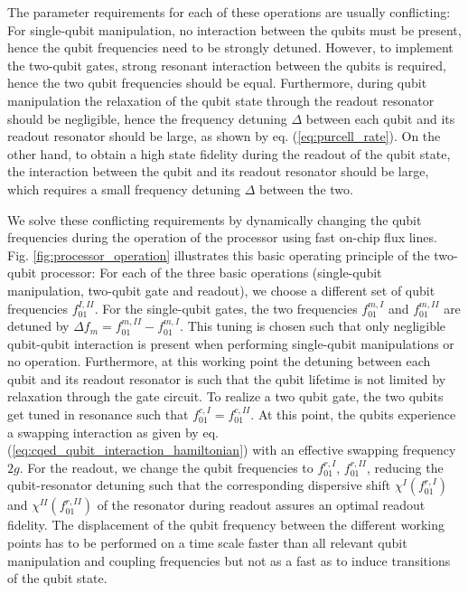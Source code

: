 The parameter requirements for each of these operations are usually conflicting: For single-qubit manipulation, no interaction between the qubits must be present, hence the qubit frequencies need to be strongly detuned. However, to implement the two-qubit gates, strong resonant interaction between the qubits is required, hence the two qubit frequencies should be equal. Furthermore, during qubit manipulation the relaxation of the qubit state through the readout resonator should be negligible, hence the frequency detuning $\Delta$ between each qubit and its readout resonator should be large, as shown by eq. (\ref{eq:purcell_rate}). On the other hand, to obtain a high state fidelity during the readout of the qubit state, the interaction between the qubit and its readout resonator should be large, which requires a small frequency detuning $\Delta$ between the two.

\smallskip

We solve these conflicting requirements by dynamically changing the qubit frequencies during the operation of the processor using fast on-chip flux lines. Fig. \ref{fig:processor_operation} illustrates this basic operating principle of the two-qubit processor: For each of the three basic operations (single-qubit manipulation, two-qubit gate and readout), we choose a different set of qubit frequencies $f_{01}^{I,II}$. For the single-qubit gates, the two frequencies $f_{01}^{m,I}$ and $f_{01}^{m,II}$ are detuned by $\Delta f_m = f_{01}^{m,II}-f_{01}^{m,I}$. This tuning is chosen such that only negligible qubit-qubit interaction is present when performing single-qubit manipulations or no operation. Furthermore, at this working point the detuning between each qubit and its readout resonator is such that the qubit lifetime is not limited by relaxation through the gate circuit. To realize a two qubit gate, the two qubits get tuned in resonance such that $f_{01}^{c,I} = f_{01}^{c,II}$. At this point, the qubits experience a swapping interaction as given by eq. (\ref{eq:cqed_qubit_interaction_hamiltonian}) with an effective swapping frequency $2g$. For the readout, we change the qubit frequencies to $f_{01}^{r,I}$, $f_{01}^{r,II}$, reducing the qubit-resonator detuning such that the corresponding dispersive shift $\chi^I(f_{01}^{r,I})$ and $\chi^{II}(f_{01}^{r,II})$ of the resonator during readout assures an optimal readout fidelity. The displacement of the qubit frequency between the different working points has to be performed on a time scale faster than all relevant qubit manipulation and coupling frequencies but not as a fast as to induce transitions of the qubit state.

